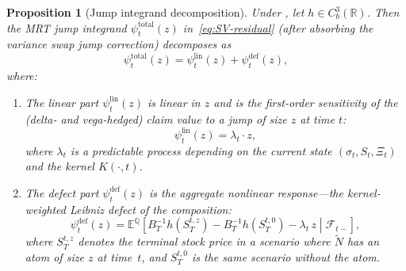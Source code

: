 \documentclass[11pt,a4paper]{article}
\theoremstyle{plain}
\newtheorem{proposition}[theorem]{Proposition}
\theoremstyle{definition}
\theoremstyle{remark}
\newcommand{\E}{\mathbb{E}}
\newcommand{\R}{\mathbb{R}}
\newcommand{\QQ}{\mathbb{Q}}
\newcommand{\F}{\mathcal{F}}
\newcommand{\Ntilde}{\widetilde{N}}
\begin{document}
\begin{proposition}[Jump integrand decomposition]\label{thm:jump-decomp}
Under ,
let $h \in C_b^3(\R)$.
Then the MRT jump integrand $\psi_t^{\mathrm{total}}(z)$
in~\eqref{eq:SV-residual} (after absorbing the variance swap
jump correction) decomposes as
\begin{equation}\label{eq:psi-decomp}
  \psi_t^{\mathrm{total}}(z) = \psi_t^{\mathrm{lin}}(z)
  + \psi_t^{\mathrm{def}}(z),
\end{equation}
where:
\begin{enumerate}[label=(\alph*)]
\item The \emph{linear part} $\psi_t^{\mathrm{lin}}(z)$ is linear
  in $z$ and is the first-order sensitivity of the (delta- and
  vega-hedged) claim value to a jump of size $z$ at time $t$:
  \begin{equation}\label{eq:psi-lin}
    \psi_t^{\mathrm{lin}}(z) = \lambda_t \cdot z,
  \end{equation}
  where $\lambda_t$ is a predictable process depending on the
  current state $(\sigma_t, S_t, \Xi_t)$ and the kernel
  $K(\cdot, t)$.

\item The \emph{defect part} $\psi_t^{\mathrm{def}}(z)$ is the
  aggregate nonlinear response---the kernel-weighted Leibniz
  defect of the composition:
  \begin{equation}\label{eq:psi-def}
    \psi_t^{\mathrm{def}}(z)
    = \E^\QQ\!\left[\left.
    B_T^{-1}h(S_T^{t,z}) - B_T^{-1}h(S_T^{t,0})
    - \lambda_t\,z\;\right|\;\F_{t-}\right],
  \end{equation}
  where $S_T^{t,z}$ denotes the terminal stock price in a
  scenario where $\Ntilde$ has an atom of size $z$ at time~$t$,
  and $S_T^{t,0}$ is the same scenario without the atom.
\end{enumerate}
\end{proposition}
\end{document}
